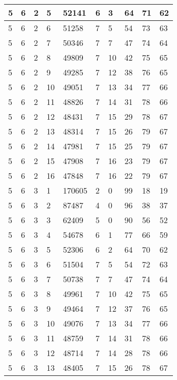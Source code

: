 \begin{table}[!ht]
\begin{tabular}{|l|l|l|l|l|l|l|l|l|l|}
        5 & 6 & 2 & 5 & 52141 & 6 & 3 & 64 & 71 & 62 \\ \hline
        5 & 6 & 2 & 6 & 51258 & 7 & 5 & 54 & 73 & 63 \\ \hline
        5 & 6 & 2 & 7 & 50346 & 7 & 7 & 47 & 74 & 64 \\ \hline
        5 & 6 & 2 & 8 & 49809 & 7 & 10 & 42 & 75 & 65 \\ \hline
        5 & 6 & 2 & 9 & 49285 & 7 & 12 & 38 & 76 & 65 \\ \hline
        5 & 6 & 2 & 10 & 49051 & 7 & 13 & 34 & 77 & 66 \\ \hline
        5 & 6 & 2 & 11 & 48826 & 7 & 14 & 31 & 78 & 66 \\ \hline
        5 & 6 & 2 & 12 & 48431 & 7 & 15 & 29 & 78 & 67 \\ \hline
        5 & 6 & 2 & 13 & 48314 & 7 & 15 & 26 & 79 & 67 \\ \hline
        5 & 6 & 2 & 14 & 47981 & 7 & 15 & 25 & 79 & 67 \\ \hline
        5 & 6 & 2 & 15 & 47908 & 7 & 16 & 23 & 79 & 67 \\ \hline
        5 & 6 & 2 & 16 & 47848 & 7 & 16 & 22 & 79 & 67 \\ \hline
        5 & 6 & 3 & 1 & 170605 & 2 & 0 & 99 & 18 & 19 \\ \hline
        5 & 6 & 3 & 2 & 87487 & 4 & 0 & 96 & 38 & 37 \\ \hline
        5 & 6 & 3 & 3 & 62409 & 5 & 0 & 90 & 56 & 52 \\ \hline
        5 & 6 & 3 & 4 & 54678 & 6 & 1 & 77 & 66 & 59 \\ \hline
        5 & 6 & 3 & 5 & 52306 & 6 & 2 & 64 & 70 & 62 \\ \hline
        5 & 6 & 3 & 6 & 51504 & 7 & 5 & 54 & 72 & 63 \\ \hline
        5 & 6 & 3 & 7 & 50738 & 7 & 7 & 47 & 74 & 64 \\ \hline
        5 & 6 & 3 & 8 & 49961 & 7 & 10 & 42 & 75 & 65 \\ \hline
        5 & 6 & 3 & 9 & 49464 & 7 & 12 & 37 & 76 & 65 \\ \hline
        5 & 6 & 3 & 10 & 49076 & 7 & 13 & 34 & 77 & 66 \\ \hline
        5 & 6 & 3 & 11 & 48759 & 7 & 14 & 31 & 78 & 66 \\ \hline
        5 & 6 & 3 & 12 & 48714 & 7 & 14 & 28 & 78 & 66 \\ \hline
        5 & 6 & 3 & 13 & 48405 & 7 & 15 & 26 & 78 & 67 \\ \hline

\end{tabular}
\end{table}
